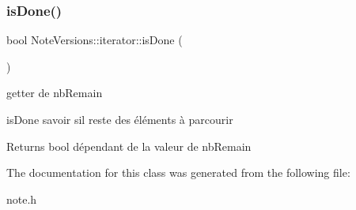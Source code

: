 \subsubsection{\texorpdfstring{is\+Done()}{isDone()}}
{\footnotesize\ttfamily bool Note\+Versions\+::iterator\+::is\+Done (\begin{DoxyParamCaption}{ }\end{DoxyParamCaption})\hspace{0.3cm}{\ttfamily [inline]}}



getter de nb\+Remain 

is\+Done savoir s\textquotesingle{}il reste des éléments à parcourir \begin{DoxyReturn}{Returns}
bool dépendant de la valeur de nb\+Remain 
\end{DoxyReturn}


The documentation for this class was generated from the following file\+:\begin{DoxyCompactItemize}
\item 
note.\+h\end{DoxyCompactItemize}

